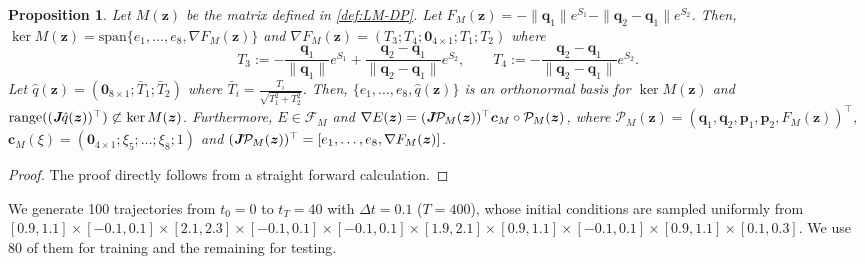 \documentclass[openacc]{rsproca_new}%
\newcommand{\z}{\bm{z}}
\newtheorem{proposition}{Proposition}
\begin{document}
\begin{proposition} \label{prop:dp}
    Let $M(\z)$ be the matrix defined 
    in \eqref{def:LM-DP}.
    Let $F_M(\z) = 
        -\|\bm{q}_1\|e^{S_1}
        -\|\bm{q}_2-\bm{q}_1\|e^{S_2}$.
    Then, $\ker M(\z) = \text{span}\{e_1,\dots,e_8,
    \nabla F_M(\z) \}$
    and 
    $\nabla F_M(\z) =
        (T_3; T_4; \bm{0}_{4\times 1}; T_1; T_2)$
    where 
    \begin{equation*}
        T_3 := -\frac{\bm{q}_1}{\|\bm{q}_1\|}e^{S_1}
        +\frac{\bm{q}_2-\bm{q}_1}{\|\bm{q}_2-\bm{q}_1\|}e^{S_2},
        \qquad
        T_4 := 
        -\frac{\bm{q}_2-\bm{q}_1}{\|\bm{q}_2-\bm{q}_1\|}e^{S_2}.
    \end{equation*}
    Let $\hat{q}(\z) = (\bm{0}_{8\times 1};  \bar{T}_1; \bar{T}_2)$
    where 
    $\bar{T}_i = \frac{T_i}{\sqrt{T_1^2+T_2^2}}$.
    Then, 
    $\{e_1,\dots,e_8,\hat{q}(\z)\}$ is an orthonormal basis for $\ker M(\z)$
    and $\text{range}((\emph{\textbf{J}}\hat{q}(\z))^\top) \not\subset \ker M(\z)$.
    Furthermore, $E \in \mathcal{F}_M$ 
    and $\nabla E(\z) = (\emph{\textbf{J}}\mathcal{P}_M(\z))^\top \bm{c}_{M} \circ \mathcal{P}_M(\z)$,
    where 
    $\mathcal{P}_M(\z) = (\bm{q}_1,\bm{q}_2,\bm{p}_1,\bm{p}_2, F_M(\z))^\top$, 
    $\bm{c}_M(\xi) = 
    (\bm{0}_{4\times 1}; \xi_5; \dots; \xi_8; 1)$
    and 
    $(\emph{\textbf{J}}\mathcal{P}_M(\z))^\top = [e_1, \dots, e_8, \nabla F_M(\z)]$.
\end{proposition}
\begin{proof}
    The proof directly follows from a straight forward calculation.
\end{proof}


 We generate 100 trajectories 
 from $t_0 = 0$ to $t_T = 40$ with $\Delta t = 0.1$
 ($T = 400$),
 whose initial conditions are sampled uniformly from $[0.9,1.1]\times[-0.1,0.1]\times[2.1,2.3]\times[-0.1,0.1]\times[-0.1,0.1]\times[1.9,2.1]\times[0.9,1.1]\times[-0.1,0.1]\times[0.9,1.1]\times[0.1,0.3]$.
 We use 80 of them for training and the remaining for testing.
 
\end{document}
